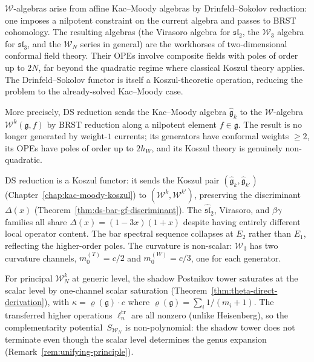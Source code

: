 $\mathcal{W}$-algebras arise from affine Kac--Moody algebras by
Drinfeld--Sokolov reduction: one imposes a nilpotent constraint on the
current algebra and passes to BRST cohomology.  The resulting
algebras (the Virasoro algebra for $\mathfrak{sl}_2$, the
$\mathcal{W}_3$ algebra for $\mathfrak{sl}_3$, and the $\mathcal{W}_N$
series in general) are the workhorses of two-dimensional conformal
field theory.  Their OPEs involve composite fields with poles
of order up to $2N$, far beyond the quadratic regime where classical
Koszul theory applies.  The Drinfeld--Sokolov
functor is itself a Koszul-theoretic operation, reducing the problem
to the already-solved Kac--Moody case.


More precisely, DS reduction \cite{DS, FF} sends the Kac--Moody algebra
$\widehat{\mathfrak{g}}_k$ to the $\mathcal{W}$-algebra
$\mathcal{W}^k(\mathfrak{g}, f)$ by BRST reduction along a nilpotent
element $f \in \mathfrak{g}$.  The result is no longer generated by
weight-$1$ currents; its generators have conformal weights $\geq 2$, its
OPEs have poles of order up to $2h_W$, and its Koszul theory is
genuinely non-quadratic.

DS reduction is a Koszul functor: it sends the Koszul pair
$(\widehat{\mathfrak{g}}_k, \widehat{\mathfrak{g}}_{k'})$
(Chapter~\ref{chap:kac-moody-koszul}) to
$(\mathcal{W}^k, \mathcal{W}^{k'})$, preserving the
discriminant $\Delta(x)$
(Theorem~\ref{thm:ds-bar-gf-discriminant}).  The
$\widehat{\mathfrak{sl}}_2$, Virasoro, and $\beta\gamma$ families
all share $\Delta(x) = (1-3x)(1+x)$ despite having entirely
different local operator content.  The bar spectral sequence collapses
at $E_2$ rather than $E_1$, reflecting the higher-order poles.  The
curvature is non-scalar: $\mathcal{W}_3$ has two curvature channels,
$m_0^{(T)} = c/2$ and $m_0^{(W)} = c/3$, one for each generator.

\begin{remark}\label{rem:w-master-mc}
For principal $\mathcal{W}_N^k$ at generic level, the shadow
Postnikov tower saturates at the scalar level by one-channel
scalar saturation
(Theorem~\ref{thm:theta-direct-derivation}), with
$\kappa = \varrho(\mathfrak{g}) \cdot c$ where
$\varrho(\mathfrak{g}) = \sum_i 1/(m_i + 1)$.
The transferred higher operations $\ell_n^{\mathrm{tr}}$ are all
nonzero (unlike Heisenberg), so the complementarity
potential~$S_{\mathcal{W}_N}$ is non-polynomial: the shadow tower
does not terminate even though the scalar level determines the
genus expansion
(Remark~\ref{rem:unifying-principle}).
\end{remark}

